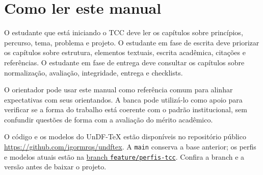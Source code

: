 \section*{Como ler este manual}

O estudante que está iniciando o TCC deve ler os capítulos sobre princípios, percurso, tema, problema e projeto. O estudante em fase de escrita deve priorizar os capítulos sobre estrutura, elementos textuais, escrita acadêmica, citações e referências. O estudante em fase de entrega deve consultar os capítulos sobre normalização, avaliação, integridade, entrega e checklists.

O orientador pode usar este manual como referência comum para alinhar expectativas com seus orientandos. A banca pode utilizá-lo como apoio para verificar se a forma do trabalho está coerente com o padrão institucional, sem confundir questões de forma com a avaliação do mérito acadêmico.

O código e os modelos do UnDF-TeX estão disponíveis no repositório público
\url{https://github.com/igormrqs/undftex}. A \texttt{main} conserva a base anterior;
os perfis e modelos atuais estão na
\href{https://github.com/igormrqs/undftex/tree/feature/perfis-tcc}{branch \texttt{feature/perfis-tcc}}.
Confira a branch e a versão antes de baixar o projeto.
